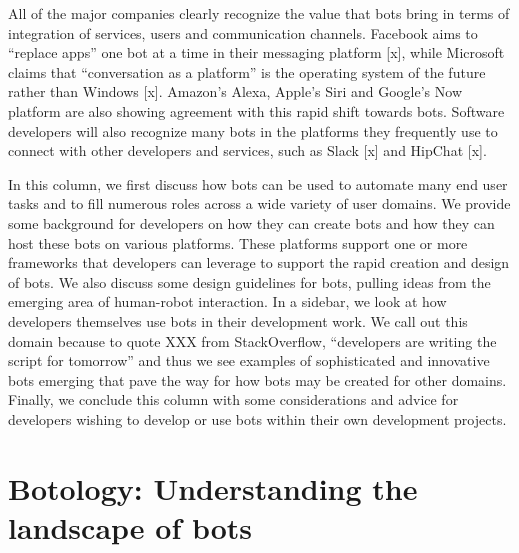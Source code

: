 \documentclass{sig-alternate}
\begin{document}
All of the major companies clearly recognize the value that bots bring in terms of integration of services, users and communication channels. Facebook aims to ``replace apps'' one bot at a time in their messaging platform [x], while Microsoft claims that ``conversation as a platform'' is the operating system of the future rather than Windows [x]. 
Amazon's Alexa, Apple's Siri and Google's Now platform are also showing agreement with this rapid shift towards bots.
Software developers will also recognize many bots in the platforms they frequently use to connect with other developers and services, such as Slack [x] and HipChat [x]. 

In this column, we first discuss how bots can be used to automate many end user tasks and to fill numerous roles across a wide variety of user domains.  
We provide some background for developers on how they can create bots and how they can host these bots on various platforms. These platforms support one or more frameworks that developers can leverage to support the rapid creation and design of bots. We also discuss some design guidelines for bots, pulling ideas from the emerging area of human-robot interaction. 
In a sidebar, we look at how developers themselves use bots in their development work.  We call out this domain because to quote XXX from StackOverflow, ``developers are writing the script for tomorrow'' and thus we see examples of sophisticated and innovative bots emerging that pave the way for how bots may be created for other domains.
Finally, we conclude this column with some considerations and advice for developers wishing to develop or use bots within their own development projects.   


 
	

	
	
%	

\section{Botology: Understanding the landscape of bots}
\end{document}

